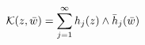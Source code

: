 \begin{equation}
{\cal K}(z, \bar w)=\sum_{j=1}^{\infty}h_j(z)\wedge\bar h_j(\bar w)
\label{kaka}
\end{equation}

